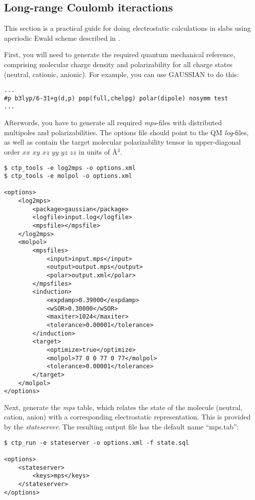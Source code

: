 \subsection{Long-range Coulomb iteractions}
\label{sec:ewald}

This section is a practical guide for doing electrostatic calculations in slabs using aperiodic Ewald scheme described in \cite{poelking_long-range_2016}.

First, you will need to generate the required quantum mechanical reference, comprising molecular charge density and polarizability for all charge states (neutral, cationic, anionic). For example, you can use  GAUSSIAN to do this:
 \begin{verbatim}
...
#p b3lyp/6-31+g(d,p) pop(full,chelpg) polar(dipole) nosymm test
...
 \end{verbatim}

Afterwords, you have to generate all required {\em mps}-files with distributed multipoles and polarizabilities.  The options file should point to the QM {\em log}-files, as well as contain the target molecular polarizability tensor in upper-diagonal order $xx$ $xy$ $xz$ $yy$ $yz$ $zz$ in units of \AA$^3$.
\begin{verbatim}
$ ctp_tools -e log2mps -o options.xml
$ ctp_tools -e molpol -o options.xml

<options>
    <log2mps>
        <package>gaussian</package>
        <logfile>input.log</logfile>
        <mpsfile></mpsfile>
    </log2mps>
    <molpol>
        <mpsfiles>
            <input>input.mps</input>
            <output>output.mps</output>
            <polar>output.xml</polar>
        </mpsfiles>
        <induction>
            <expdamp>0.39000</expdamp>
            <wSOR>0.30000</wSOR>
            <maxiter>1024</maxiter>
            <tolerance>0.00001</tolerance>
        </induction>
        <target>
            <optimize>true</optimize>
            <molpol>77 0 0 77 0 77</molpol>
            <tolerance>0.00001</tolerance>
        </target>
    </molpol>
</options>
  \end{verbatim}
 
Next, generate the {\it mps} table, which relates the state of the molecule (neutral, cation, anion) with a corresponding electrostatic representation. This  is provided by the {\em stateserver}. The resulting output file has the default name ``mps.tab'':
\begin{verbatim}
$ ctp_run -e stateserver -o options.xml -f state.sql

<options>
    <stateserver>
        <keys>mps</keys>
    </stateserver>
</options>
\end{verbatim}

